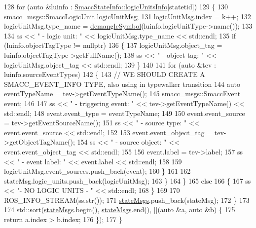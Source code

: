 \begin{DoxyCode}
128             \textcolor{keywordflow}{for} (\textcolor{keyword}{auto} &luinfo : \hyperlink{classsmacc_1_1SmaccStateInfo_a7a22f3c1ea22042a19f897db4ecfeb67}{SmaccStateInfo::logicUnitsInfo}[statetid])
129             \{
130                 smacc\_msgs::SmaccLogicUnit logicUnitMsg;
131                 logicUnitMsg.index = k++;
132                 logicUnitMsg.type\_name = \hyperlink{namespacesmacc_a458f5e70d468824fbcd66cc7729deaa8}{demangleSymbol}(luinfo.logicUnitType->name());
133 
134                 ss << \textcolor{stringliteral}{" - logic unit: "} << logicUnitMsg.type\_name << std::endl;
135                 \textcolor{keywordflow}{if} (luinfo.objectTagType != \textcolor{keyword}{nullptr})
136                 \{
137                     logicUnitMsg.object\_tag = luinfo.objectTagType->getFullName();
138                     ss << \textcolor{stringliteral}{"        - object tag: "} << logicUnitMsg.object\_tag << std::endl;
139                 \}
140 
141                 \textcolor{keywordflow}{for} (\textcolor{keyword}{auto} &tev : luinfo.sourceEventTypes)
142                 \{
143                     \textcolor{comment}{// WE SHOULD CREATE A SMACC\_EVENT\_INFO TYPE, also using in typewalker transition}
144                     \textcolor{keyword}{auto} eventTypeName = tev->getEventTypeName();
145                     smacc\_msgs::SmaccEvent event;
146 
147                     ss << \textcolor{stringliteral}{"             - triggering event: "} << tev->getEventTypeName() << std::endl;
148                     \textcolor{keyword}{event}.event\_type = eventTypeName;
149 
150                     \textcolor{keyword}{event}.event\_source = tev->getEventSourceName();
151                     ss << \textcolor{stringliteral}{"                 - source type: "} << \textcolor{keyword}{event}.event\_source << std::endl;
152 
153                     \textcolor{keyword}{event}.event\_object\_tag = tev->getObjectTagName();
154                     ss << \textcolor{stringliteral}{"                 - source object: "} << \textcolor{keyword}{event}.event\_object\_tag << std::endl;
155 
156                     \textcolor{keyword}{event}.label = tev->label;
157                     ss << \textcolor{stringliteral}{"                 - event label: "} << \textcolor{keyword}{event}.label << std::endl;
158 
159                     logicUnitMsg.event\_sources.push\_back(event);
160                 \}
161 
162                 stateMsg.logic\_units.push\_back(logicUnitMsg);
163             \}
164         \}
165         \textcolor{keywordflow}{else}
166         \{
167             ss << \textcolor{stringliteral}{"- NO LOGIC UNITS - "} << std::endl;
168         \}
169 
170         ROS\_INFO\_STREAM(ss.str());
171         \hyperlink{classsmacc_1_1SmaccStateMachineInfo_aac401ecee7b25676a316e3dbdc680af8}{stateMsgs}.push\_back(stateMsg);
172     \}
173 
174     std::sort(\hyperlink{classsmacc_1_1SmaccStateMachineInfo_aac401ecee7b25676a316e3dbdc680af8}{stateMsgs}.begin(), \hyperlink{classsmacc_1_1SmaccStateMachineInfo_aac401ecee7b25676a316e3dbdc680af8}{stateMsgs}.end(), [](\textcolor{keyword}{auto} &a, \textcolor{keyword}{auto} &b) \{
175         \textcolor{keywordflow}{return} a.index > b.index;
176     \});
177 \}
\end{DoxyCode}


